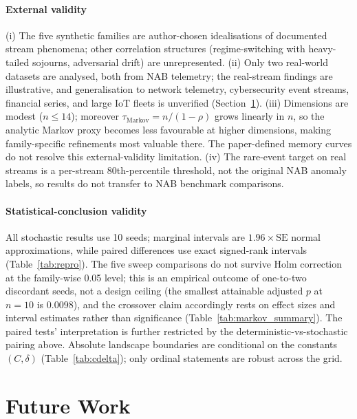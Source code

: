 \documentclass[sensors,article,submit,pdftex,moreauthors]{Definitions/mdpi}
\begin{document}
\paragraph{External validity} (i) The five synthetic families are author-chosen idealisations of documented stream phenomena; other correlation structures (regime-switching with heavy-tailed sojourns, adversarial drift) are unrepresented. (ii) Only two real-world datasets are analysed, both from NAB telemetry; the real-stream findings are illustrative, and generalisation to network telemetry, cybersecurity event streams, financial series, and large IoT fleets is unverified (Section~\ref{sec:future_work}). (iii) Dimensions are modest ($n \leq 14$); moreover $\tau_{\text{Markov}} = n/(1-\rho)$ grows linearly in $n$, so the analytic Markov proxy becomes less favourable at higher dimensions, making family-specific refinements most valuable there. The paper-defined memory curves do not resolve this external-validity limitation. (iv) The rare-event target on real streams is a per-stream 80th-percentile threshold, not the original NAB anomaly labels, so results do not transfer to NAB benchmark comparisons.

\paragraph{Statistical-conclusion validity} All stochastic results use 10 seeds; marginal intervals are $1.96 \times \mathrm{SE}$ normal approximations, while paired differences use exact signed-rank intervals (Table~\ref{tab:repro}). The five sweep comparisons do not survive Holm correction at the family-wise 0.05 level; this is an empirical outcome of one-to-two discordant seeds, not a design ceiling (the smallest attainable adjusted $p$ at $n = 10$ is $0.0098$), and the crossover claim accordingly rests on effect sizes and interval estimates rather than significance (Table~\ref{tab:markov_summary}). The paired tests' interpretation is further restricted by the deterministic-vs-stochastic pairing above. Absolute landscape boundaries are conditional on the constants $(C, \delta)$ (Table~\ref{tab:cdelta}); only ordinal statements are robust across the grid.


\section{Future Work}
\label{sec:future_work}
\end{document}
